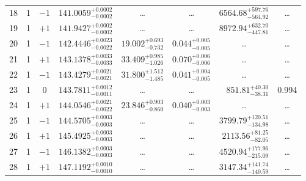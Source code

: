 \begin{table*}[!]
\begin{tabular}{llcrrlrc}
18 & 1 & $-1$ & $    141.0059_{-      0.0002}^{+      0.0002}$ & \multicolumn{1}{c}{\dots} & \multicolumn{1}{c}{\dots} & $     6564.68_{-      564.92}^{+      597.76}$ & \dots \\[1pt]
19 & 1 & $+1$ & $    141.9427_{-      0.0002}^{+      0.0002}$ & \multicolumn{1}{c}{\dots} & \multicolumn{1}{c}{\dots} & $     8972.94_{-      447.81}^{+      632.70}$ & \dots \\[1pt]
20 & 1 & $-1$ & $    142.4446_{-      0.0022}^{+      0.0023}$ & $      19.002_{-       0.732}^{+       0.693}$ & $       0.044_{-       0.005}^{+       0.005}$ & \multicolumn{1}{c}{\dots} & \dots \\[1pt]
21 & 1 & $+1$ & $    143.1378_{-      0.0033}^{+      0.0033}$ & $      33.409_{-       1.026}^{+       0.985}$ & $       0.070_{-       0.006}^{+       0.006}$ & \multicolumn{1}{c}{\dots} & \dots \\[1pt]
22 & 1 & $-1$ & $    143.4279_{-      0.0021}^{+      0.0021}$ & $      31.800_{-       1.485}^{+       1.512}$ & $       0.041_{-       0.005}^{+       0.004}$ & \multicolumn{1}{c}{\dots} & \dots \\[1pt]
23 & 1 & 0 & $    143.7811_{-      0.0011}^{+      0.0012}$ & \multicolumn{1}{c}{\dots} & \multicolumn{1}{c}{\dots} & $      851.81_{-       38.31}^{+       40.30}$ & 0.994 \\[1pt]
24 & 1 & $+1$ & $    144.0546_{-      0.0022}^{+      0.0021}$ & $      23.846_{-       0.860}^{+       0.903}$ & $       0.040_{-       0.003}^{+       0.003}$ & \multicolumn{1}{c}{\dots} & \dots\\[1pt]
25 & 1 & $-1$ & $    144.5705_{-      0.0003}^{+      0.0003}$ & \multicolumn{1}{c}{\dots} & \multicolumn{1}{c}{\dots} & $     3799.79_{-      134.98}^{+      120.51}$ & \dots \\[1pt]
26 & 1 & $+1$ & $    145.4925_{-      0.0003}^{+      0.0003}$ & \multicolumn{1}{c}{\dots} & \multicolumn{1}{c}{\dots} & $     2113.56_{-       82.05}^{+       81.25}$ & \dots \\[1pt]
27 & 1 & $-1$ & $    146.1382_{-      0.0003}^{+      0.0003}$ & \multicolumn{1}{c}{\dots} & \multicolumn{1}{c}{\dots} & $     4520.94_{-      215.09}^{+      177.96}$ & \dots \\[1pt]
28 & 1 & $+1$ & $    147.1192_{-      0.0010}^{+      0.0010}$ & \multicolumn{1}{c}{\dots} & \multicolumn{1}{c}{\dots} & $     3147.34_{-      140.59}^{+      141.74}$ & \dots \\[1pt]


\end{tabular}
\end{table*}

